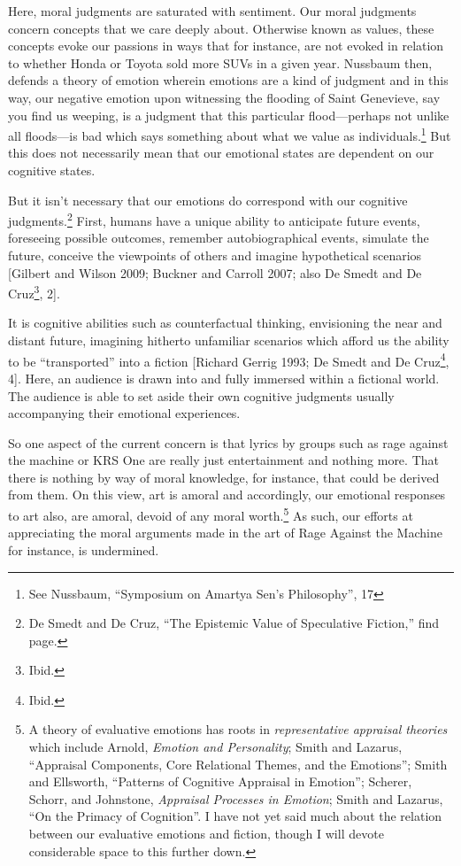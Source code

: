 \documentclass[phdthesis,12pt,final]{wuthesis}
\theoremstyle{definition}
\theoremstyle{definition}
\theoremstyle{definition}
\theoremstyle{definition}
\theoremstyle{remark}
\begin{document}
Here, moral judgments are saturated with sentiment. Our moral judgments concern concepts that we care deeply about. Otherwise known as values, these concepts evoke our passions in ways that for instance, are not evoked in relation to whether Honda or Toyota sold more SUVs in a given year. Nussbaum then, defends a theory of emotion wherein emotions are a kind of judgment and in this way, our negative emotion upon witnessing the flooding of Saint Genevieve, say you find us weeping, is a judgment that this particular flood---perhaps not unlike all floods---is bad which says something about what we value as individuals.\footnote{See Nussbaum, {``Symposium on {Amartya Sen}'s Philosophy''}, 17} But this does not necessarily mean that our emotional states are dependent on our cognitive states.

But it isn't necessary that our emotions do correspond with our cognitive judgments.\footnote{De Smedt and De Cruz, {``The Epistemic Value of Speculative Fiction,''} find page.} First, humans have a unique ability to anticipate future events, foreseeing possible outcomes, remember autobiographical events, simulate the future, conceive the viewpoints of others and imagine hypothetical scenarios {[}Gilbert and Wilson 2009; Buckner and Carroll 2007; also De Smedt and De Cruz\footnote{Ibid.}, 2{]}.

It is cognitive abilities such as counterfactual thinking, envisioning the near and distant future, imagining hitherto unfamiliar scenarios which afford us the ability to be ``transported'' into a fiction {[}Richard Gerrig 1993; De Smedt and De Cruz\footnote{Ibid.}, 4{]}. Here, an audience is drawn into and fully immersed within a fictional world. The audience is able to set aside their own cognitive judgments usually accompanying their emotional experiences.

So one aspect of the current concern is that lyrics by groups such as rage against the machine or KRS One are really just entertainment and nothing more. That there is nothing by way of moral knowledge, for instance, that could be derived from them. On this view, art is amoral and accordingly, our emotional responses to art also, are amoral, devoid of any moral worth.\footnote{A theory of evaluative emotions has roots in \emph{representative appraisal theories} which include Arnold, \emph{Emotion and {Personality}}; Smith and Lazarus, {``Appraisal {Components}, {Core Relational Themes}, and the {Emotions}''}; Smith and Ellsworth, {``Patterns of {Cognitive Appraisal} in {Emotion}''}; Scherer, Schorr, and Johnstone, \emph{Appraisal Processes in Emotion}; Smith and Lazarus, {``On the {Primacy} of {Cognition}''}. I have not yet said much about the relation between our evaluative emotions and fiction, though I will devote considerable space to this further down.} As such, our efforts at appreciating the moral arguments made in the art of Rage Against the Machine for instance, is undermined.
\end{document}
